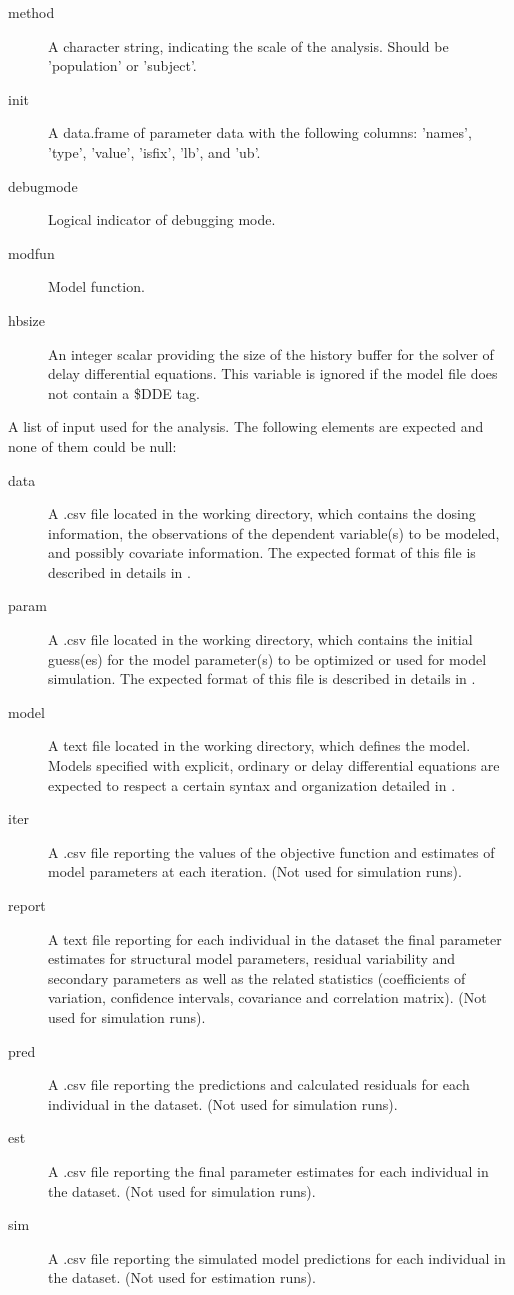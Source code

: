 \begin{Arguments}
\begin{ldescription}
\begin{description}
\item[method] A character string, indicating the scale of the analysis. Should
be 'population' or 'subject'.
\item[init] A data.frame of parameter data with the following columns:
'names', 'type', 'value', 'isfix', 'lb', and 'ub'.
\item[debugmode] Logical indicator of debugging mode.
\item[modfun] Model function.
\item[hbsize] An integer scalar providing the size of the history buffer for
the solver of delay differential equations. This variable is ignored if
the model file does not contain a \$DDE tag.

\end{description}


\item[\code{files}] A list of input used for the analysis. The following elements are
expected and none of them could be null: \begin{description}

\item[data] A .csv file located in the working directory, which contains
the dosing information, the observations of the dependent variable(s)
to be modeled, and possibly covariate information. The expected format 
of this file is described in details in .
\item[param] A .csv file located in the working directory, which contains
the initial guess(es) for the model parameter(s) to be optimized or used
for model simulation. The expected format of this file is described in
details in .
\item[model] A text file located in the working directory, which defines 
the model. Models specified with explicit, ordinary or delay
differential equations are expected to respect a certain syntax and 
organization detailed in .
\item[iter] A .csv file reporting the values of the objective function
and estimates of model parameters at each iteration.  (Not used for 
simulation runs).
\item[report] A text file reporting for each individual in the dataset the
final parameter estimates for structural model parameters, residual 
variability and secondary parameters as well as the related statistics 
(coefficients of variation, confidence intervals, covariance and 
correlation matrix). (Not used for simulation runs).
\item[pred] A .csv file reporting the predictions and calculated residuals
for each individual in the dataset. (Not used for simulation runs).
\item[est] A .csv file reporting the final parameter estimates for each
individual in the dataset. (Not used for simulation runs).
\item[sim] A .csv file reporting the simulated model predictions for each 
individual in the dataset. (Not used for estimation runs).


\end{description}
\end{ldescription}
\end{Arguments}
